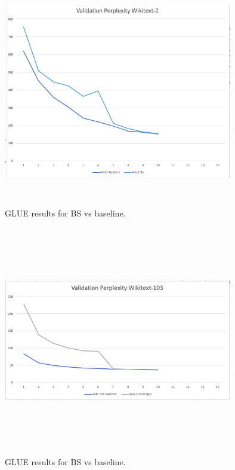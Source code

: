 \begin{figure}[h]
\centering
\includegraphics[width=10cm, height=10cm]{Thesis/images/bs-wiki2-valid.png}
\caption{GLUE results for BS vs baseline.}
\end{figure}
\begin{figure}[h]
\centering
\includegraphics[width=10cm, height=10cm]{Thesis/images/bs-wiki103-valid.png}
\caption{GLUE results for BS vs baseline.}
\end{figure}
